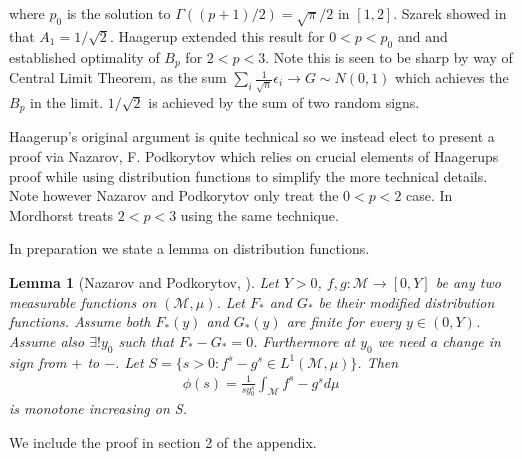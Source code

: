 \documentclass[10pt]{article}
\newcommand{\1}{\textbf{1}}
\newtheorem{lemma}{Lemma}[subsection]
\theoremstyle{remark}
\theoremstyle{definition}
\begin{document}
where $p_0$ is the solution to $\Gamma((p+1)/2) = \sqrt{\pi}/2$ in $[1,2]$. Szarek showed in \cite{S} that $A_1 = 1/\sqrt{2}$. Haagerup extended this result for $0 < p < p_0$ and and established optimality of $B_p$ for $2 < p <3$. Note this is seen to be sharp by way of Central Limit Theorem, as the sum $\sum_i \frac{1}{\sqrt{n}}\epsilon_i \to G \sim N(0,1)$ which achieves the $B_p$ in the limit. $1/\sqrt{2}$ is achieved by the sum of two random signs.

Haagerup's original argument is quite technical so we instead elect to present a proof via Nazarov, F. Podkorytov \cite{NP} which relies on crucial elements of Haagerups proof while using distribution functions to simplify the more technical details. Note however Nazarov and Podkorytov only treat the $0 < p <2$ case. In \cite{M} Mordhorst treats $2 < p < 3$ using the same technique.

In preparation we state a lemma on distribution functions.

\begin{lemma}[Nazarov and Podkorytov, \cite{NP}]
	Let $Y > 0$, $f,g : \mathcal{M} \to [0,Y]$ be any two measurable functions on $(\mathcal{M},\mu)$. Let $F_*$ and $G_*$ be their modified distribution functions. Assume both $F_*(y)$ and $G_*(y)$ are finite for every $y \in (0,Y)$. Assume also $\exists ! y_0$ such that $F_*-G_* = 0$. Furthermore at $y_0$ we need a change in sign from $+$ to $-$. Let $S = \{s > 0: f^s - g^s \in L^1(\mathcal{M},\mu)\}$. Then
	\begin{align*}
		\phi(s) = \frac{1}{sy_0^s}\int_{\mathcal{M}}f^s - g^s d\mu
	\end{align*}
	is monotone increasing on S. 
\end{lemma}

We include the proof in section 2 of the appendix.

\end{document}
